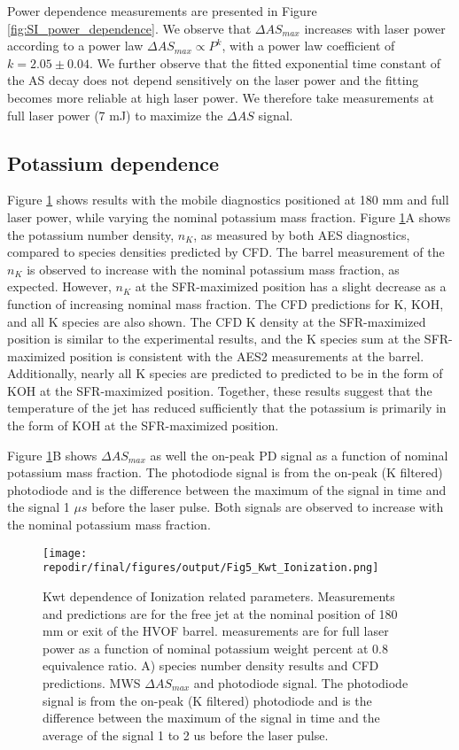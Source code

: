 Power dependence measurements are presented in Figure \ref{fig:SI_power_dependence}. We observe that $\Delta AS_{max}$ increases with laser power according to a power law $\Delta AS_{max} \propto P^{k}$, with a power law coefficient of $k = 2.05 \pm 0.04$. We further observe that the fitted exponential time constant of the AS decay does not depend sensitively on the laser power and the fitting becomes more reliable at high laser power. We therefore take measurements at full laser power (7 mJ) to maximize the $\Delta AS$ signal.


\clearpage

\subsection{Potassium dependence}

Figure \ref{fig:kwt_ionization} shows results with the mobile diagnostics positioned at 180 mm and full laser power, while varying the nominal potassium mass fraction. Figure \ref{fig:kwt_ionization}A shows the potassium number density, $n_K$, as measured by both AES diagnostics, compared to species densities predicted by CFD. The barrel measurement of the $n_K$ is observed to increase with the nominal potassium mass fraction, as expected. However, $n_K$ at the SFR-maximized position has a slight decrease as a function of increasing nominal mass fraction. The CFD predictions for K, KOH, and all K species are also shown.  The CFD K density at the SFR-maximized position is similar to the experimental results, and the K species sum at the SFR-maximized position is consistent with the AES2 measurements at the barrel. Additionally, nearly all K species are predicted to predicted to be in the form of KOH at the SFR-maximized position. Together, these results suggest that the temperature of the jet has reduced sufficiently that the potassium is primarily in the form of KOH at the SFR-maximized position.

Figure  \ref{fig:kwt_ionization}B shows $\Delta AS_{max}$ as well the on-peak PD signal as a function of nominal potassium mass fraction. The photodiode signal is from the on-peak (K filtered) photodiode and is the difference between the maximum of the signal in time and the signal 1 $\mu s$ before the laser pulse. Both signals are observed to increase with the nominal potassium mass fraction. 

\begin{figure}[h]
    \centering
    \texttt{[image: \\repodir/final/figures/output/Fig5\_Kwt\_Ionization.png]} 
    \caption{Kwt dependence of Ionization related parameters. Measurements and predictions are for the free jet at the nominal position of 180 mm or exit of the HVOF barrel. measurements are for full laser power as a function of nominal potassium weight percent at 0.8 equivalence ratio. A) species number density results and CFD predictions. MWS $\Delta AS_{max}$ and photodiode signal. The photodiode signal is from the on-peak (K filtered) photodiode and is the difference between the maximum of the signal in time and the average of the signal 1 to 2 us before the laser pulse.  }
    \label{fig:kwt_ionization}
\end{figure}


